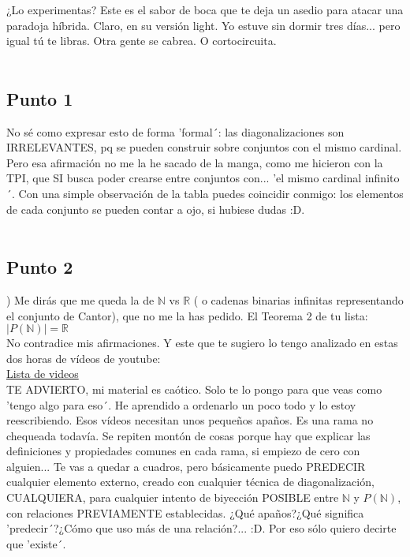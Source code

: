 	\noindent
	¿Lo experimentas? Este es el sabor de boca que te deja un asedio para atacar una paradoja híbrida. Claro, en su versión light. Yo estuve sin dormir tres días... pero igual tú te libras. Otra gente se cabrea. O cortocircuita.\\\\
	
	\subsection{Punto 1}
	
	\noindent
	No sé como expresar esto de forma 'formal´: las diagonalizaciones son IRRELEVANTES, pq se pueden construir sobre conjuntos con el mismo cardinal. Pero esa afirmación no me la he sacado de la manga, como me hicieron con la TPI, que SI busca poder crearse entre conjuntos con... 'el mismo cardinal infinito´. Con una simple observación de la tabla puedes coincidir conmigo: los elementos de cada conjunto se pueden contar a ojo, si hubiese dudas :D.\\\\
	
	\subsection{Punto 2}
	
	) Me dirás que me queda la de $\mathbb{N}$ vs $\mathbb{R}$ ( o cadenas binarias infinitas representando el conjunto de Cantor), que no me la has pedido. El Teorema 2 de tu lista:\\
	$|P(\mathbb{N})| = \mathbb{R}$\\
	No contradice mis afirmaciones. Y este que te sugiero lo tengo analizado en estas dos horas de vídeos de youtube:\\
	\href{https://www.youtube.com/watch?v=reRUUKGFXf0&list=PLcEv5UNDUdw68yFXf2kYGDZVyIGpCfGdy}{Lista de videos}\\
	TE ADVIERTO, mi material es caótico. Solo te lo pongo para que veas como 'tengo algo para eso´. He aprendido a ordenarlo un poco todo y lo estoy reescribiendo. Esos vídeos necesitan unos pequeños apaños. Es una rama no chequeada todavía. Se repiten montón de cosas porque hay que explicar las definiciones y propiedades comunes en cada rama, si empiezo de cero con alguien... Te vas a quedar a cuadros, pero básicamente puedo PREDECIR cualquier elemento externo, creado con cualquier técnica de diagonalización, CUALQUIERA, para cualquier intento de biyección POSIBLE entre $\mathbb{N}$ y $P(\mathbb{N})$, con relaciones PREVIAMENTE establecidas. ¿Qué apaños?¿Qué significa 'predecir´?¿Cómo que uso más de una relación?... :D. Por eso sólo quiero decirte que 'existe´.
	
